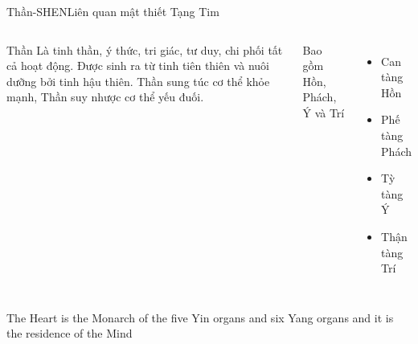 \documentclass[
	11pt, %
]{beamer}
\theoremstyle{newblock}
\begin{document}
\begin{frame}{Thần-SHEN}{Liên quan mật thiết Tạng Tim}
	\begin{columns}
		\begin{block}{Thần}
			Là tinh thần, ý thức, tri giác, tư duy, chi phối tất cả hoạt động. Được sinh ra từ tinh tiên thiên và nuôi dưỡng bởi tinh hậu thiên. Thần sung túc cơ thể khỏe mạnh, Thần suy nhược cơ thể yếu đuối.
		\end{block}
		Bao gồm Hồn, Phách, Ý và Trí
		\begin{itemize}
			\item Can tàng Hồn
			\item Phế tàng Phách
			\item Tỳ tàng Ý
			\item Thận tàng Trí
		\end{itemize}

	\end{columns}
	
	\small{The Heart is the Monarch of the five Yin organs and six Yang organs and it is the residence of the Mind}
\end{frame}
\end{document}
